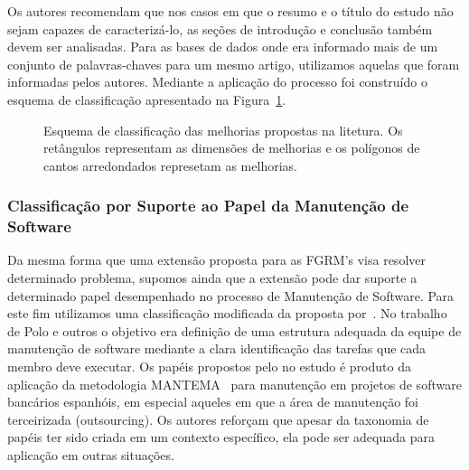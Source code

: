 Os autores recomendam que nos casos em que o resumo e o título do estudo não
sejam capazes de caracterizá-lo, as seções de introdução e conclusão também
devem ser analisadas. Para as bases de dados onde era informado mais de um
conjunto de palavras-chaves para um mesmo artigo, utilizamos aquelas que foram
informadas pelos autores. Mediante a aplicação do processo foi construído o
esquema de classificação apresentado na
Figura~\ref{fig:diagrama-esquema-dimensao-melhorias}.

\begin{figure}[tb]
\centering
\caption{Esquema de classificação das melhorias propostas na litetura. Os
	retângulos representam as dimensões de melhorias e os polígonos de cantos
	arredondados represetam as melhorias.}
\label{fig:diagrama-esquema-dimensao-melhorias}
\end{figure}







\subsubsection{Classificação por Suporte ao Papel da Manutenção de Software}
\label{subsubsec:map-esquema-suporte-papel-man}

Da mesma forma que uma extensão proposta para as FGRM's visa resolver
determinado problema, supomos ainda que a extensão pode dar suporte a
determinado papel desempenhado no processo de Manutenção de Software. Para este
fim utilizamos uma classificação modificada da proposta por~\cite{Polo1999}. No
trabalho de Polo e outros o objetivo era definição de uma estrutura adequada da
equipe de manutenção de software mediante a clara identificação das tarefas que
cada membro deve executar. Os papéis propostos pelo no estudo é produto da
aplicação da metodologia MANTEMA~\cite{756695} para manutenção em projetos de
software bancários espanhóis, em especial aqueles em que a área de manutenção
foi terceirizada (outsourcing). Os autores reforçam que apesar da taxonomia de
papéis ter sido criada em um contexto específico, ela pode ser adequada para
aplicação em outras situações.

